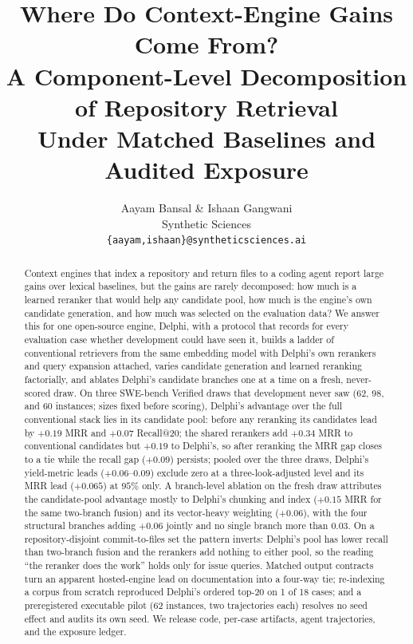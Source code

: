 \documentclass{article}
\title{Where Do Context-Engine Gains Come From?\\A Component-Level Decomposition of Repository Retrieval\\Under Matched Baselines and Audited Exposure}
\author{Aayam Bansal \& Ishaan Gangwani \\
Synthetic Sciences \\
\texttt{\{aayam,ishaan\}@syntheticsciences.ai}}
\newcommand{\system}{Delphi}
\begin{document}
\maketitle
{}

\begin{abstract}
Context engines that index a repository and return files to a coding agent report large gains over lexical baselines, but the gains are rarely decomposed: how much is a learned reranker that would help any candidate pool, how much is the engine's own candidate generation, and how much was selected on the evaluation data? We answer this for one open-source engine, \system{}, with a protocol that records for every evaluation case whether development could have seen it, builds a ladder of conventional retrievers from the same embedding model with \system{}'s own rerankers and query expansion attached, varies candidate generation and learned reranking factorially, and ablates \system{}'s candidate branches one at a time on a fresh, never-scored draw. On three SWE-bench Verified draws that development never saw (62, 98, and 60 instances; sizes fixed before scoring), \system{}'s advantage over the full conventional stack lies in its candidate pool: before any reranking its candidates lead by $+0.19$ MRR and $+0.07$ Recall@20; the shared rerankers add $+0.34$ MRR to conventional candidates but $+0.19$ to \system{}'s, so after reranking the MRR gap closes to a tie while the recall gap ($+0.09$) persists; pooled over the three draws, \system{}'s yield-metric leads ($+0.06$--$0.09$) exclude zero at a three-look-adjusted level and its MRR lead ($+0.065$) at $95\%$ only. A branch-level ablation on the fresh draw attributes the candidate-pool advantage mostly to \system{}'s chunking and index ($+0.15$ MRR for the same two-branch fusion) and its vector-heavy weighting ($+0.06$), with the four structural branches adding $+0.06$ jointly and no single branch more than $0.03$. On a repository-disjoint commit-to-files set the pattern inverts: \system{}'s pool has lower recall than two-branch fusion and the rerankers add nothing to either pool, so the reading ``the reranker does the work'' holds only for issue queries. Matched output contracts turn an apparent hosted-engine lead on documentation into a four-way tie; re-indexing a corpus from scratch reproduced \system{}'s ordered top-20 on 1 of 18 cases; and a preregistered executable pilot (62 instances, two trajectories each) resolves no seed effect and audits its own seed. We release code, per-case artifacts, agent trajectories, and the exposure ledger.
\end{abstract}
\end{document}
